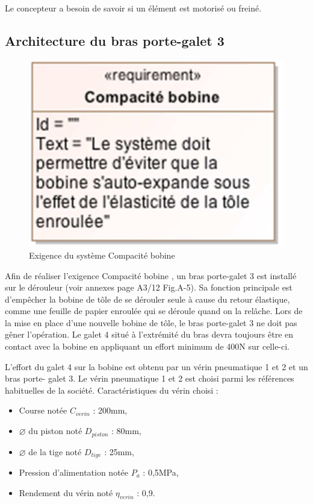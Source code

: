 Le concepteur a besoin de savoir si un élément est motorisé ou freiné.


\subsection{Architecture du bras porte-galet 3}

\begin{figure}[!h]
 \centering\includegraphics[width=0.3\linewidth]{img/fig8}
 \caption{ Exigence du système \og Compacité bobine \fg}
 \label{fig8}
\end{figure}

Afin de réaliser l'exigence \og Compacité bobine \fg, un bras porte-galet 3 est installé sur le dérouleur (voir annexes page A3/12 Fig.A-5). Sa fonction principale est d'empêcher la bobine de tôle de se dérouler seule à cause du retour élastique, comme une feuille de papier enroulée qui se déroule quand on la relâche. Lors de la mise en place d'une nouvelle bobine de tôle, le bras porte-galet 3 ne doit pas gêner l'opération. Le galet 4 situé à l'extrémité du bras devra toujours être en contact avec la bobine en appliquant un effort minimum de
400N sur celle-ci.

L'effort du galet 4 sur la bobine est obtenu par un vérin pneumatique 1 et 2 et un bras porte-
galet 3. Le vérin pneumatique 1 et 2 est choisi parmi les références habituelles de la société.
Caractéristiques du vérin choisi :
\begin{itemize}
 \item Course notée $C_{verin}$ : 200mm,
 \item $\varnothing$ du piston noté $D_{piston}$ : 80mm,
 \item $\varnothing$ de la tige noté $D_{tige}$ : 25mm,
 \item Pression d'alimentation notée $P_a$ : 0,5MPa,
 \item Rendement du vérin noté $\eta_{verin}$ : 0,9.
\end{itemize}

